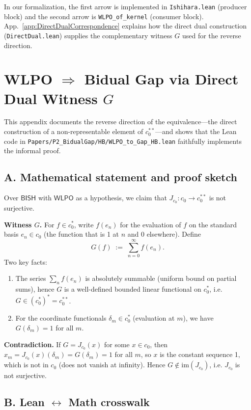 \documentclass[11pt]{article}
\begin{document}
In our formalization, the first arrow is implemented in \texttt{Ishihara.lean} (producer block) and the second arrow is \texttt{WLPO\_of\_kernel} (consumer block). App.~\ref{app:DirectDualCorrespondence} explains how the direct dual construction (\texttt{DirectDual.lean}) supplies the complementary witness $G$ used for the reverse direction.

\section{WLPO $\Rightarrow$ Bidual Gap via Direct Dual Witness $G$}
\label{app:WLPOtoGap-Direct}

This appendix documents the reverse direction of the equivalence---the direct construction of a non-representable element of $c_0^{**}$---and shows that the Lean code in
\texttt{Papers/P2\_BidualGap/HB/WLPO\_to\_Gap\_HB.lean}
faithfully implements the informal proof.

\subsection*{A. Mathematical statement and proof sketch}

Over $\mathsf{BISH}$ with $\mathsf{WLPO}$ as a hypothesis, we claim that
$J_{c_0}:c_0\to c_0^{**}$ is not surjective.

\textbf{Witness $G$.} For $f\in c_0^\ast$, write $f(e_n)$ for the evaluation of $f$ on the standard basis $e_n\in c_0$ (the function that is 1 at $n$ and 0 elsewhere). Define
\[G(f) \;:=\; \sum_{n=0}^{\infty} f(e_n).\]
Two key facts:
\begin{enumerate}
\item The series $\sum_n f(e_n)$ is absolutely summable (uniform bound on partial sums), hence $G$ is a well-defined bounded linear functional on $c_0^\ast$, i.e. $G\in (c_0^\ast)^\ast=c_0^{**}$.
\item For the coordinate functionals $\delta_m\in c_0^\ast$ (evaluation at $m$), we have $G(\delta_m)=1$ for all $m$.
\end{enumerate}

\textbf{Contradiction.} If $G=J_{c_0}(x)$ for some $x\in c_0$, then
$x_m=J_{c_0}(x)(\delta_m)=G(\delta_m)=1$ for all $m$, so $x$ is the constant sequence 1, which is not in $c_0$ (does not vanish at infinity). Hence $G\notin \mathrm{im}(J_{c_0})$, i.e. $J_{c_0}$ is not surjective.

\subsection*{B. Lean $\leftrightarrow$ Math crosswalk}
\end{document}
